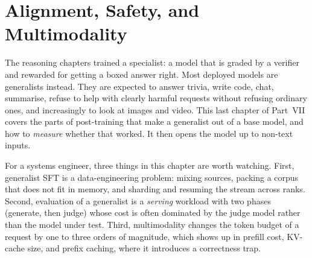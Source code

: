 \chapter{Alignment, Safety, and Multimodality}\label{ch:alignment}

The reasoning chapters trained a specialist: a model that is graded by a verifier and rewarded
for getting a boxed answer right. Most deployed models are generalists instead. They are
expected to answer trivia, write code, chat, summarise, refuse to help with clearly harmful
requests without refusing ordinary ones, and increasingly to look at images and video. This
last chapter of Part~VII covers the parts of post-training that make a generalist out of a base
model, and how to \emph{measure} whether that worked. It then opens the model up to non-text
inputs.

For a systems engineer, three things in this chapter are worth watching. First, generalist
SFT is a data-engineering problem: mixing sources, packing a corpus that does not fit in
memory, and sharding and resuming the stream across ranks. Second, evaluation of a generalist is
a \emph{serving} workload with two phases (generate, then judge) whose cost is often dominated by
the judge model rather than the model under test. Third, multimodality changes the token budget
of a request by one to three orders of magnitude, which shows up in prefill cost, KV-cache
size, and prefix caching, where it introduces a correctness trap.


